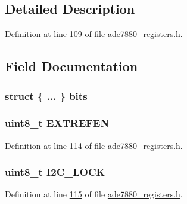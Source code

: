 \subsection{Detailed Description}


Definition at line \hyperlink{a00036_source_l00109}{109} of file \hyperlink{a00036_source}{ade7880\-\_\-registers.\-h}.



\subsection{Field Documentation}
\hypertarget{a00022_a73eff37a9b918713343460e37c589b93}{
\subsubsection[{bits}]{\setlength{\rightskip}{0pt plus 5cm}struct \{ ... \}  bits}}\label{d7/de0/a00022_a73eff37a9b918713343460e37c589b93}
\hypertarget{a00022_a291582fa01a543f0329ea1758bdafe85}{
\subsubsection[{E\-X\-T\-R\-E\-F\-E\-N}]{\setlength{\rightskip}{0pt plus 5cm}uint8\-\_\-t E\-X\-T\-R\-E\-F\-E\-N}}\label{d7/de0/a00022_a291582fa01a543f0329ea1758bdafe85}


Definition at line \hyperlink{a00036_source_l00114}{114} of file \hyperlink{a00036_source}{ade7880\-\_\-registers.\-h}.

\hypertarget{a00022_a552928a455bd7e037a3593655c5215e3}{
\subsubsection[{I2\-C\-\_\-\-L\-O\-C\-K}]{\setlength{\rightskip}{0pt plus 5cm}uint8\-\_\-t I2\-C\-\_\-\-L\-O\-C\-K}}\label{d7/de0/a00022_a552928a455bd7e037a3593655c5215e3}


Definition at line \hyperlink{a00036_source_l00115}{115} of file \hyperlink{a00036_source}{ade7880\-\_\-registers.\-h}.


